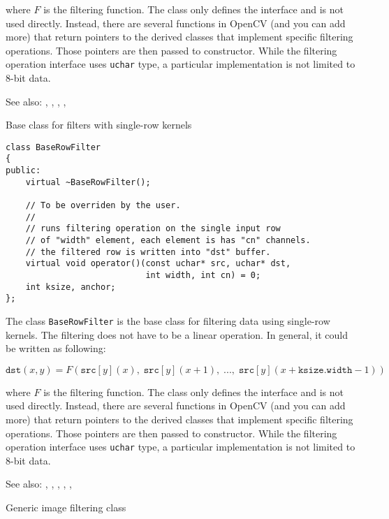 where $F$ is the filtering function. The class only defines the interface and is not used directly. Instead, there are several functions in OpenCV (and you can add more) that return pointers to the derived classes that implement specific filtering operations. Those pointers are then passed to  constructor. While the filtering operation interface uses \texttt{uchar} type, a particular implementation is not limited to 8-bit data.

See also: , , ,
    , 

Base class for filters with single-row kernels

\begin{lstlisting}
class BaseRowFilter
{
public:
    virtual ~BaseRowFilter();
    
    // To be overriden by the user.
    //
    // runs filtering operation on the single input row
    // of "width" element, each element is has "cn" channels.
    // the filtered row is written into "dst" buffer.
    virtual void operator()(const uchar* src, uchar* dst,
                            int width, int cn) = 0;
    int ksize, anchor;
};
\end{lstlisting}

The class \texttt{BaseRowFilter} is the base class for filtering data using single-row kernels. The filtering does not have to be a linear operation. In general, it could be written as following:

\[\texttt{dst}(x,y) = F(\texttt{src}[y](x),\;\texttt{src}[y](x+1),\;...,\;\texttt{src}[y](x+\texttt{ksize.width}-1))\]

where $F$ is the filtering function. The class only defines the interface and is not used directly. Instead, there are several functions in OpenCV (and you can add more) that return pointers to the derived classes that implement specific filtering operations. Those pointers are then passed to  constructor. While the filtering operation interface uses \texttt{uchar} type, a particular implementation is not limited to 8-bit data.

See also: , , ,
 , , 

Generic image filtering class

